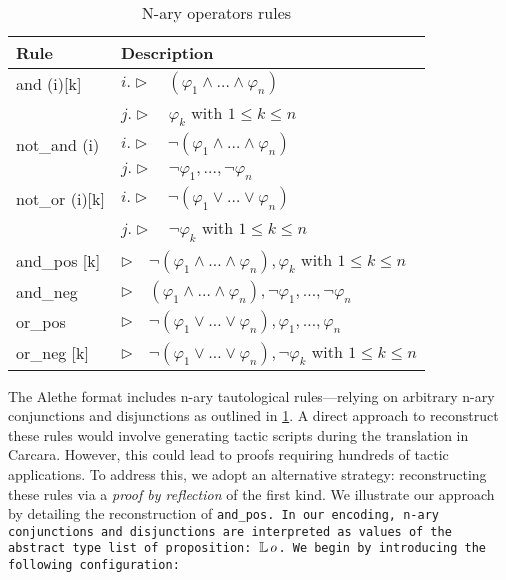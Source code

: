 \begin{table}
\centering
\caption{N-ary operators rules}
\begin{tabular}{ll}
Rule & Description \\ \hline
and (i)[k] & $i. \triangleright \quad (\varphi_1 \land \dots \land \varphi_n)$ \\
    & $j. \triangleright \quad \varphi_k $ with $1 \leq k \leq n$\\[1em]
not\_and (i) & $i. \triangleright \quad \neg (\varphi_1 \land \dots \land \varphi_n)$ \\
    & $j. \triangleright \quad \neg \varphi_1, \dots, \neg \varphi_n $\\[1em]
not\_or (i)[k] & $i. \triangleright \quad \neg (\varphi_1 \lor \dots \lor \varphi_n)$\\
    & $j. \triangleright \quad \neg \varphi_k$ with $1 \leq k \leq n$\\[1em]
and\_pos [k] & $\triangleright \quad \neg (\varphi_1 \land \dots \land \varphi_n), \varphi_k$ with $1 \leq k \leq n$ \\[1em]
and\_neg & $\triangleright \quad (\varphi_1 \land \dots \land \varphi_n), \neg \varphi_1, \dots, \neg \varphi_n$ \\[1em]
or\_pos & $\triangleright \quad \neg (\varphi_1 \lor \dots \lor \varphi_n), \varphi_1, \dots, \varphi_n$ \\[1em]
or\_neg [k] & $\triangleright \quad \neg (\varphi_1 \lor \dots \lor \varphi_n), \neg \varphi_k$ with $1 \leq k \leq n$ \\
\end{tabular}
\label{table:nary-rules}
\end{table}

The Alethe format includes n-ary tautological rules—relying on arbitrary n-ary conjunctions and disjunctions as outlined in \cref{table:nary-rules}.
A direct approach to reconstruct these rules would involve generating tactic scripts during the translation in Carcara.
However, this could lead to proofs requiring hundreds of tactic applications.
To address this, we adopt an alternative strategy: reconstructing these rules via a \emph{proof by reflection} of the first kind.
We illustrate our approach by detailing the reconstruction of \tt{and\_pos}.
In our encoding, n-ary conjunctions and disjunctions are interpreted as values of the abstract type list of proposition: $\mathbb{L}\,o$.
We begin by introducing the following configuration:

